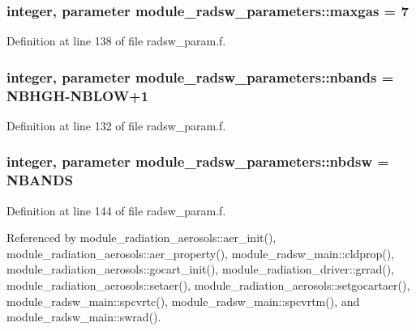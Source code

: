 \subsubsection[{\texorpdfstring{maxgas}{maxgas}}]{\setlength{\rightskip}{0pt plus 5cm}integer, parameter module\+\_\+radsw\+\_\+parameters\+::maxgas = 7}\hypertarget{namespacemodule__radsw__parameters_a5bc6fbb4231281a604352eec6b8e2bfc}{}\label{namespacemodule__radsw__parameters_a5bc6fbb4231281a604352eec6b8e2bfc}


Definition at line 138 of file radsw\+\_\+param.\+f.

\subsubsection[{\texorpdfstring{nbands}{nbands}}]{\setlength{\rightskip}{0pt plus 5cm}integer, parameter module\+\_\+radsw\+\_\+parameters\+::nbands = N\+B\+H\+GH-\/N\+B\+L\+OW+1}\hypertarget{namespacemodule__radsw__parameters_a8f97b7698e8e5e2aec6e463fd09255cc}{}\label{namespacemodule__radsw__parameters_a8f97b7698e8e5e2aec6e463fd09255cc}


Definition at line 132 of file radsw\+\_\+param.\+f.

\subsubsection[{\texorpdfstring{nbdsw}{nbdsw}}]{\setlength{\rightskip}{0pt plus 5cm}integer, parameter module\+\_\+radsw\+\_\+parameters\+::nbdsw = N\+B\+A\+N\+DS}\hypertarget{namespacemodule__radsw__parameters_ab1e121fde29dde00871e4a7d43be1ddb}{}\label{namespacemodule__radsw__parameters_ab1e121fde29dde00871e4a7d43be1ddb}


Definition at line 144 of file radsw\+\_\+param.\+f.



Referenced by module\+\_\+radiation\+\_\+aerosols\+::aer\+\_\+init(), module\+\_\+radiation\+\_\+aerosols\+::aer\+\_\+property(), module\+\_\+radsw\+\_\+main\+::cldprop(), module\+\_\+radiation\+\_\+aerosols\+::gocart\+\_\+init(), module\+\_\+radiation\+\_\+driver\+::grrad(), module\+\_\+radiation\+\_\+aerosols\+::setaer(), module\+\_\+radiation\+\_\+aerosols\+::setgocartaer(), module\+\_\+radsw\+\_\+main\+::spcvrtc(), module\+\_\+radsw\+\_\+main\+::spcvrtm(), and module\+\_\+radsw\+\_\+main\+::swrad().

